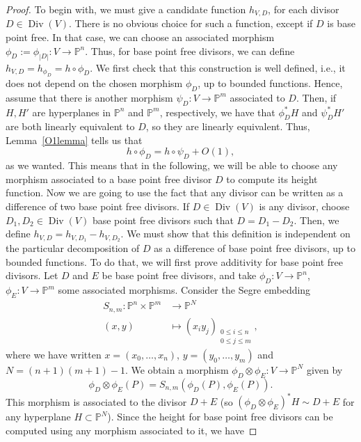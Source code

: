 \documentclass[a4paper, 12pt]{amsart}
\theoremstyle{definition}
\theoremstyle{plain}
\theoremstyle{plain}
\theoremstyle{plain}
\theoremstyle{plain}
\theoremstyle{remark}
\theoremstyle{remark}
\theoremstyle{plain}
\newcommand{\lemref}[1]{Lemma~\ref{#1}}
\DeclareMathOperator{\Div}{Div}
\begin{document}
	\begin{proof}
		To begin with, we must give a candidate function $h_{V,D}$, for each divisor $D\in\Div(V)$. There is no obvious choice for such a function, except if $D$ is base point free. In that case, we can choose an associated morphism $\phi_D:=\phi_{|D|}:V\rightarrow \mathbb{P}^n$. Thus, for base point free divisors, we can define $h_{V,D}=h_{\phi_D}=h\circ\phi_D$. We first check that this construction is well defined, i.e., it does not depend on the chosen morphism $\phi_D$, up to bounded functions. Hence, assume that there is another morphism $\psi_D:V\rightarrow\mathbb{P}^m$ associated to $D$. Then, if $H,H'$ are hyperplanes in $\mathbb{P}^n$ and $\mathbb{P}^m$, respectively, we have that $\phi_D^*H$ and $\psi_D^*H'$ are both linearly equivalent to $D$, so they are linearly equivalent. Thus, \lemref{O1lemma} tells us that
		\begin{equation*}
			h\circ\phi_D=h\circ \psi_D+O(1),
		\end{equation*}
		as we wanted. This means that in the following, we will be able to choose any morphism associated to a base point free divisor $D$ to compute its height function. Now we are going to use the fact that any divisor can be written as a difference of two base point free divisors. If $D\in\Div(V)$ is any divisor, choose $D_1,D_2\in\Div(V)$ base point free divisors such that $D=D_1-D_2$. Then, we define $h_{V,D}=h_{V,D_1}-h_{V,D_2}$. We must show that this definition is independent on the particular decomposition of $D$ as a difference of base point free divisors, up to bounded functions. To do that, we will first prove additivity for base point free divisors. Let $D$ and $E$ be base point free divisors, and take $\phi_D:V\rightarrow \mathbb{P}^n$, $\phi_E:V\rightarrow\mathbb{P}^m$ some associated morphisms. Consider the Segre embedding
		\begin{align*}
			S_{n,m}:\mathbb{P}^n\times\mathbb{P}^m&\rightarrow \mathbb{P}^N\\
			(x,y)&\mapsto (x_iy_j)_{\substack{0\le i\le n\\ 0\le j\le m}},
		\end{align*}
		where we have written $x=(x_0,\ldots,x_n)$, $y=(y_0,\ldots,y_m)$ and $N=(n+1)(m+1)-1$. We obtain a morphism $\phi_D\otimes\phi_E:V\rightarrow\mathbb{P}^N$ given by
		\begin{equation*}
			\phi_D\otimes\phi_E(P)=S_{n,m}(\phi_D(P),\phi_E(P)).
		\end{equation*}
		This morphism is associated to the divisor $D+E$ (so $(\phi_D\otimes\phi_E)^*H\sim D+E$ for any hyperplane $H\subset\mathbb{P}^N$). Since the height for base point free divisors can be computed using any morphism associated to it, we have

\end{proof}
\end{document}
